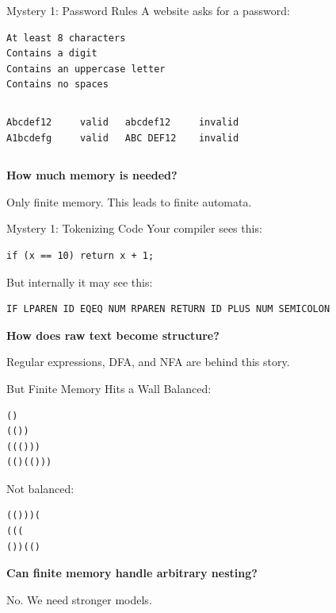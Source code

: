 \documentclass[10pt,aspectratio=169]{beamer}
\newcommand{\BigQ}[1]{\begin{center}\Large\bfseries #1\end{center}}
\newcommand{\tagline}[1]{\begin{center}\alert{#1}\end{center}}
\begin{document}
\begin{frame}[fragile]{Mystery 1: Password Rules}
A website asks for a password:

\begin{lstlisting}
At least 8 characters
Contains a digit
Contains an uppercase letter
Contains no spaces
\end{lstlisting}

\pause
\begin{columns}[T]
\begin{lstlisting}
Abcdef12     valid
A1bcdefg     valid
\end{lstlisting}

\begin{lstlisting}
abcdef12     invalid
ABC DEF12    invalid
\end{lstlisting}
\end{columns}

\pause
\vspace{0.8em}
\BigQ{How much memory is needed?}

\pause
\tagline{Only finite memory. This leads to finite automata.}
\end{frame}

\begin{frame}[fragile]{Mystery 1: Tokenizing Code}
Your compiler sees this:

\begin{lstlisting}
if (x == 10) return x + 1;
\end{lstlisting}

\pause
But internally it may see this:

\begin{lstlisting}
IF LPAREN ID EQEQ NUM RPAREN RETURN ID PLUS NUM SEMICOLON
\end{lstlisting}

\pause
\vspace{0.8em}
\BigQ{How does raw text become structure?}

\pause
\tagline{Regular expressions, DFA, and NFA are behind this story.}
\end{frame}

\begin{frame}[fragile]{But Finite Memory Hits a Wall}
Balanced:
\begin{lstlisting}
()
(())
((()))
(()(()))
\end{lstlisting}

\pause
Not balanced:
\begin{lstlisting}
(()))(
(((
())(()
\end{lstlisting}

\pause
\vspace{0.6em}
\BigQ{Can finite memory handle arbitrary nesting?}

\pause
\tagline{No. We need stronger models.}
\end{frame}
\end{document}
